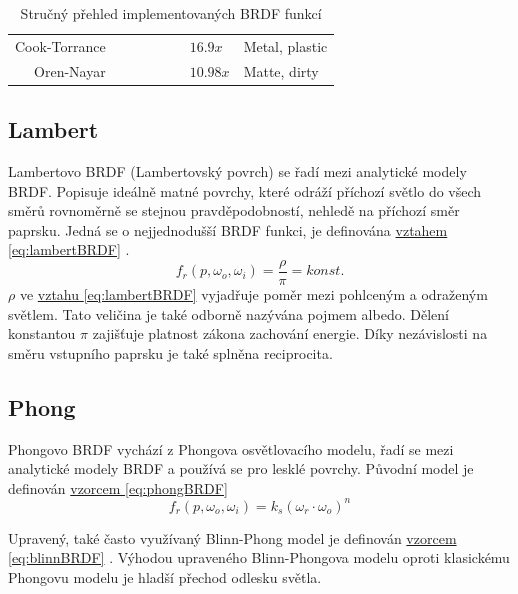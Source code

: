 \documentclass[czech,master]{diploma}
\newcommand{\point}{p}
\newcommand{\brdf}{f_r\left(\point,\omega_{o},\omega_{i}\right)}
\newcommand{\outVec}{\omega_{o}}
\newcommand{\refl}{\omega_{r}}
\newcommand{\alb}{\rho}
\newcommand{\true}{\ding{51}}
\newcommand{\false}{\ding{55}}
\begin{document}
\begin{table}[ht]
\begin{tabular}{r|lllllll}
    Cook-Torrance       & \true                    & \true                     & \true                       & \false                      & \false                   & \(16.9x\)                          & Metal, plastic                \\
    Oren-Nayar          & \true                    & \true                     & \false                      & \false                      & \true                    & \(10.98x\)                         & Matte, dirty                  \\
    \hline
  \end{tabular}
  \caption{Stručný přehled implementovaných BRDF funkcí}
  \label{tab:brdfProperties}
\end{table}

\subsection{Lambert} \label{sec:Lambert}
Lambertovo BRDF (Lambertovský povrch) se řadí mezi analytické modely BRDF. Popisuje ideálně matné povrchy, které odráží příchozí světlo do všech směrů rovnoměrně se stejnou pravděpodobností, nehledě na příchozí směr paprsku. Jedná se o nejjednodušší BRDF funkci, je definována \hyperref[eq:lambertBRDF]{vztahem \ref{eq:lambertBRDF}} \cite{Koppal2014}.
\begin{equation} \label{eq:lambertBRDF}
  \brdf = \frac{\alb}{\pi} = konst.
\end{equation}
\(\alb\) ve \hyperref[eq:lambertBRDF]{vztahu \ref{eq:lambertBRDF}} vyjadřuje poměr mezi pohlceným a odraženým světlem. Tato veličina je také odborně nazývána pojmem albedo. Dělení konstantou \(\pi\) zajišťuje platnost zákona zachování energie. Díky nezávislosti na směru vstupního paprsku je také splněna reciprocita.

\subsection{Phong} \label{sec:Phong}
Phongovo BRDF vychází z Phongova osvětlovacího modelu, řadí se mezi analytické modely BRDF a používá se pro lesklé povrchy. Původní model je definován \hyperref[eq:phongBRDF]{vzorcem \ref{eq:phongBRDF}} \cite{Phong1975}
\begin{equation} \label{eq:phongBRDF}
  \brdf = k_s(\refl\cdot\outVec)^n
\end{equation}

Upravený, také často využívaný Blinn-Phong model je definován \hyperref[eq:blinnBRDF]{vzorcem \ref{eq:blinnBRDF}} \cite{BlinnPhong1977}. Výhodou upraveného Blinn-Phongova modelu oproti klasickému Phongovu modelu je hladší přechod odlesku světla.
\end{document}
